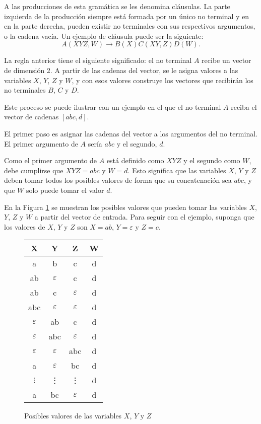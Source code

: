 A las producciones de esta gramática se les denomina cláusulas. La parte izquierda de la producción 
siempre está formada por un único no terminal y en en la parte derecha, pueden existir no terminales 
con sus respectivos argumentos, o la cadena vacía. Un ejemplo de cláusula puede ser la siguiente:
$$A(XYZ,W)\to B(X)C(XY,Z)D(W).$$

La regla anterior tiene el siguiente significado: el no terminal $A$ recibe un vector de dimensión 2. A partir 
de las cadenas del vector, se le asigna valores a las variables $X$, $Y$, $Z$ y $W$, y con esos valores 
construye los vectores que recibirán los no terminales $B$, $C$ y $D$.

Este proceso se puede ilustrar con un ejemplo en el que el no terminal $A$ reciba el vector de cadenas $[abc, d]$.

El primer paso es asignar las cadenas del vector a los argumentos del no terminal. El primer argumento de $A$ sería $abc$ y el segundo, $d$.

Como el primer argumento de $A$ está definido como $XYZ$ y el segundo como $W$, debe cumplirse que $XYZ=abc$ y $W=d$. Esto significa que las variables $X$, $Y$ y $Z$ deben tomar todos los posibles valores de forma que su concatenación sea $abc$, y que $W$ solo puede tomar el valor $d$.

En la Figura \ref{fig:xyz_eaxmple} se muestran los posibles valores que pueden tomar las variables $X$, $Y$, $Z$ y $W$ a partir del vector de entrada. Para seguir con el ejemplo, suponga que los valores de $X$, $Y$ y $Z$ son $X=ab$, $Y=\varepsilon$ y $Z=c$.


\begin{figure}
    \centering
    \begin{tabular}{|c|c|c|c|}
        \hline
        X             & Y             & Z             & W \\
        \hline
        a             & b             & c             & d \\
        \hline
        ab            & $\varepsilon$ & c             & d \\
        \hline
        ab            & c             & $\varepsilon$ & d \\
        \hline
        abc           & $\varepsilon$ & $\varepsilon$ & d \\
        \hline
        $\varepsilon$ & ab            & c             & d \\
        \hline
        $\varepsilon$ & abc           & $\varepsilon$ & d \\
        \hline
        $\varepsilon$ & $\varepsilon$ & abc           & d \\
        \hline
        a             & $\varepsilon$ & bc            & d \\
        \hline
        $\vdots$      & \vdots        & \vdots        & d \\
        \hline
        a             & bc            & $\varepsilon$ & d \\
        \hline
    \end{tabular}
    \caption{Posibles valores de las variables $X$, $Y$ y $Z$}
    \label{fig:xyz_eaxmple}
\end{figure}

